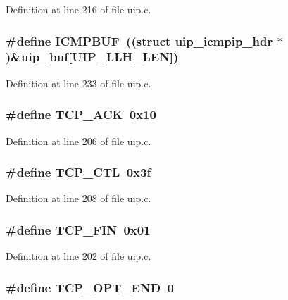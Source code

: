 Definition at line 216 of file uip.c.

\hypertarget{group__uip_ga4309376690872fa4beb4f025f5cc199b}{
\subsubsection[{ICMPBUF}]{\setlength{\rightskip}{0pt plus 5cm}\#define ICMPBUF~((struct {\bf uip\_\-icmpip\_\-hdr} $\ast$)\&{\bf uip\_\-buf}\mbox{[}UIP\_\-LLH\_\-LEN\mbox{]})}}
\label{group__uip_ga4309376690872fa4beb4f025f5cc199b}


Definition at line 233 of file uip.c.

\hypertarget{group__uip_ga44b3b1ab31a403ba28ec135adfcbefef}{
\subsubsection[{TCP\_\-ACK}]{\setlength{\rightskip}{0pt plus 5cm}\#define TCP\_\-ACK~0x10}}
\label{group__uip_ga44b3b1ab31a403ba28ec135adfcbefef}


Definition at line 206 of file uip.c.

\hypertarget{group__uip_ga1425d4a0c2760adb653a04c0fb137a8d}{
\subsubsection[{TCP\_\-CTL}]{\setlength{\rightskip}{0pt plus 5cm}\#define TCP\_\-CTL~0x3f}}
\label{group__uip_ga1425d4a0c2760adb653a04c0fb137a8d}


Definition at line 208 of file uip.c.

\hypertarget{group__uip_ga88e60aa2cf23e1c65d630701db08c743}{
\subsubsection[{TCP\_\-FIN}]{\setlength{\rightskip}{0pt plus 5cm}\#define TCP\_\-FIN~0x01}}
\label{group__uip_ga88e60aa2cf23e1c65d630701db08c743}


Definition at line 202 of file uip.c.

\hypertarget{group__uip_ga1215163245304bad20d6c5608ad75ab7}{
\subsubsection[{TCP\_\-OPT\_\-END}]{\setlength{\rightskip}{0pt plus 5cm}\#define TCP\_\-OPT\_\-END~0}}
\label{group__uip_ga1215163245304bad20d6c5608ad75ab7}


